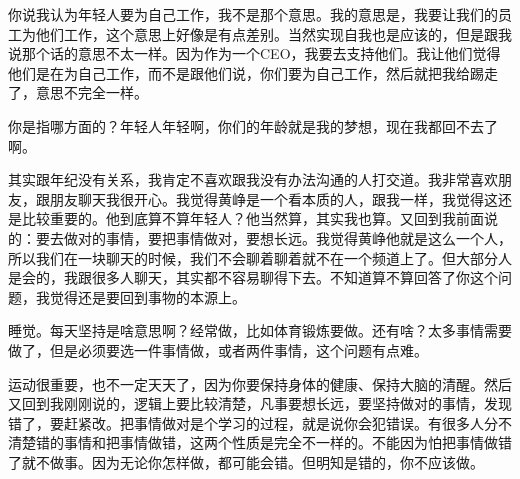 

你说我认为年轻人要为自己工作，我不是那个意思。我的意思是，我要让我们的员工为他们工作，这个意思上好像是有点差别。当然实现自我也是应该的，但是跟我说那个话的意思不太一样。因为作为一个CEO，我要去支持他们。我让他们觉得他们是在为自己工作，而不是跟他们说，你们要为自己工作，然后就把我给踢走了，意思不完全一样。


你是指哪方面的？年轻人年轻啊，你们的年龄就是我的梦想，现在我都回不去了啊。


其实跟年纪没有关系，我肯定不喜欢跟我没有办法沟通的人打交道。我非常喜欢朋友，跟朋友聊天我很开心。我觉得黄峥是一个看本质的人，跟我一样，我觉得这还是比较重要的。他到底算不算年轻人？他当然算，其实我也算。又回到我前面说的：要去做对的事情，要把事情做对，要想长远。我觉得黄峥他就是这么一个人，所以我们在一块聊天的时候，我们不会聊着聊着就不在一个频道上了。但大部分人是会的，我跟很多人聊天，其实都不容易聊得下去。不知道算不算回答了你这个问题，我觉得还是要回到事物的本源上。



睡觉。每天坚持是啥意思啊？经常做，比如体育锻炼要做。还有啥？太多事情需要做了，但是必须要选一件事情做，或者两件事情，这个问题有点难。


运动很重要，也不一定天天了，因为你要保持身体的健康、保持大脑的清醒。然后又回到我刚刚说的，逻辑上要比较清楚，凡事要想长远，要坚持做对的事情，发现错了，要赶紧改。把事情做对是个学习的过程，就是说你会犯错误。有很多人分不清楚错的事情和把事情做错，这两个性质是完全不一样的。不能因为怕把事情做错了就不做事。因为无论你怎样做，都可能会错。但明知是错的，你不应该做。



